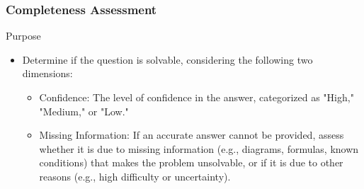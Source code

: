 \subsubsection{Completeness Assessment}



\begin{purposebox}{Purpose}
\begin{itemize}
    \item Determine if the question is solvable, considering the following two dimensions:
    \begin{itemize}[label=\textbullet]
        \item Confidence: The level of confidence in the answer, categorized as "High," "Medium," or "Low."
        \item Missing Information: If an accurate answer cannot be provided, assess whether it is due to missing information (e.g., diagrams, formulas, known conditions) that makes the problem unsolvable, or if it is due to other reasons (e.g., high difficulty or uncertainty).
    \end{itemize}
\end{itemize}
\end{purposebox}

